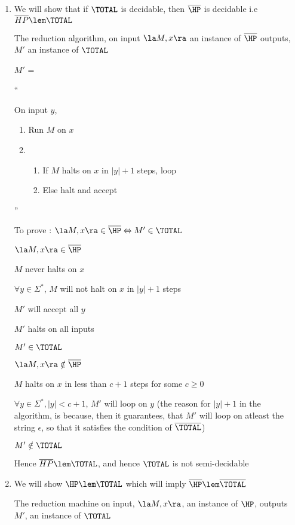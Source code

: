 \begin{enumerate}
\item We will show that if $\TOTAL$ is decidable, then $\overline{\HP}$ is decidable i.e $\overline{HP} \lem \TOTAL$

The reduction algorithm, on input $\la M, x \ra$ an instance of $\overline{\HP}$ outputs, $M'$ an instance of $\TOTAL$

$M'$ = 

``

On input $y$,
    \begin{enumerate}
        \item Run $M$ on $x$
        \item \begin{enumerate}
            \item If $M$ halts on $x$ in $|y| + 1$ steps, loop
            \item Else halt and accept
        \end{enumerate}
    \end{enumerate}

''

To prove : $\la M, x \ra \in \overline{\HP} \Leftrightarrow M' \in \TOTAL$

$\la M, x \ra \in \overline{\HP}$

\imp
$M$ never halts on $x$

\imp
$\forall y \in \Sigma^*$, $M$ will not halt on $x$ in $|y| + 1$ steps

\imp
$M'$ will accept all $y$

\imp
$M'$ halts on all inputs

\imp
$M' \in \TOTAL$

$\la M, x \ra \notin \overline{\HP}$

\imp
$M$ halts on $x$ in less than $c + 1$ steps for some $c \ge 0$

\imp
$\forall y \in \Sigma^*, |y| < c + 1$, $M'$ will loop on $y$
(the reason for $|y| + 1$ in the algorithm, is because, then it guarantees, that $M'$ will loop on atleast the string $\epsilon$, so that it satisfies the condition of $\overline{\TOTAL}$)

\imp
$M' \notin \TOTAL$


Hence $\overline{HP} \lem \TOTAL$, and hence $\TOTAL$ is not semi-decidable


\item We will show $\HP \lem \TOTAL$ which will imply $\overline{\HP} \lem \overline{\TOTAL}$


The reduction machine on input, $\la M, x \ra$, an instance of $\HP$, outputs $M'$, an instance of $\TOTAL$


\end{enumerate}
